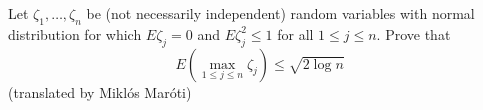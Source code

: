 Let $\zeta_1, \ldots, \zeta_n$ be (not necessarily independent) random variables with normal distribution for which $E\zeta_j=0$ and $E\zeta_j^2\le 1$ for all $1\le j\le n$. Prove that
$$E\left( \max_{1\le j\le n} \zeta_j \right)\le\sqrt{2\log n}$$
(translated by Miklós Maróti)
